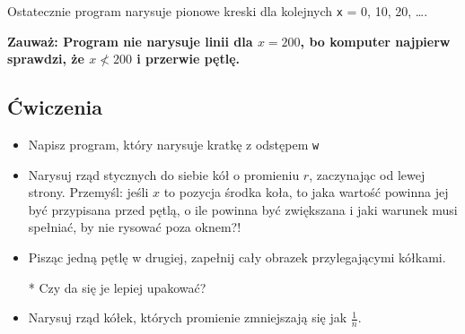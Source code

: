 \documentclass[landscape]{article}
\newcommand{\red}{\color{Red}}
\begin{document}
Ostatecznie program narysuje pionowe kreski dla kolejnych {\tt x} = 0, 10, 20, \ldots.

{\bf {\red Zauważ:} Program nie narysuje linii dla $x=200$, bo komputer najpierw sprawdzi, że $x\not< 200$ i przerwie pętlę.}


\subsection*{Ćwiczenia}
\begin{itemize}
\item Napisz program, który narysuje kratkę z odstępem {\tt w}
\item Narysuj rząd stycznych do siebie kół o promieniu $r$, zaczynając od lewej strony. Przemyśl: jeśli $x$ to pozycja środka koła, to jaka wartość powinna jej być przypisana przed pętlą, o ile powinna być zwiększana i jaki warunek musi spełniać, by nie rysować poza oknem?!
\item Pisząc jedną pętlę w drugiej, zapełnij cały obrazek przylegającymi kółkami.
\item[*] Czy da się je lepiej upakować?
\item Narysuj rząd kółek, których promienie zmniejszają się jak $\frac{1}{n}$.
\end{itemize}
\end{document}
